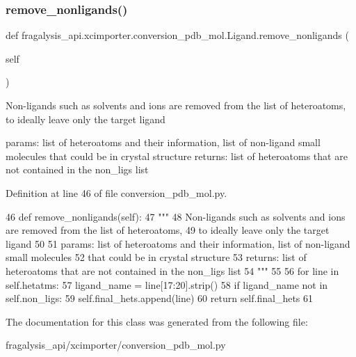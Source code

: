 \subsubsection{\texorpdfstring{remove\+\_\+nonligands()}{remove\_nonligands()}}
{\footnotesize\ttfamily def fragalysis\+\_\+api.\+xcimporter.\+conversion\+\_\+pdb\+\_\+mol.\+Ligand.\+remove\+\_\+nonligands (\begin{DoxyParamCaption}\item[{}]{self }\end{DoxyParamCaption})}

\begin{DoxyVerb}Non-ligands such as solvents and ions are removed from the list of heteroatoms,
to ideally leave only the target ligand

params: list of heteroatoms and their information, list of non-ligand small molecules
    that could be in crystal structure
returns: list of heteroatoms that are not contained in the non_ligs list
\end{DoxyVerb}
 

Definition at line 46 of file conversion\+\_\+pdb\+\_\+mol.\+py.


\begin{DoxyCode}
46     \textcolor{keyword}{def }remove\_nonligands(self):
47         \textcolor{stringliteral}{"""}
48 \textcolor{stringliteral}{        Non-ligands such as solvents and ions are removed from the list of heteroatoms,}
49 \textcolor{stringliteral}{        to ideally leave only the target ligand}
50 \textcolor{stringliteral}{}
51 \textcolor{stringliteral}{        params: list of heteroatoms and their information, list of non-ligand small molecules}
52 \textcolor{stringliteral}{            that could be in crystal structure}
53 \textcolor{stringliteral}{        returns: list of heteroatoms that are not contained in the non\_ligs list}
54 \textcolor{stringliteral}{        """}
55 
56         \textcolor{keywordflow}{for} line \textcolor{keywordflow}{in} self.hetatms:
57             ligand\_name = line[17:20].strip()
58             \textcolor{keywordflow}{if} ligand\_name \textcolor{keywordflow}{not} \textcolor{keywordflow}{in} self.non\_ligs:
59                 self.final\_hets.append(line)
60         \textcolor{keywordflow}{return} self.final\_hets
61 
\end{DoxyCode}


The documentation for this class was generated from the following file\+:\begin{DoxyCompactItemize}
\item 
fragalysis\+\_\+api/xcimporter/conversion\+\_\+pdb\+\_\+mol.\+py\end{DoxyCompactItemize}
